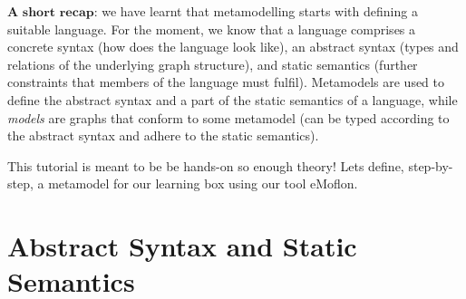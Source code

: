 $\textbf{A short recap:}$  we have learnt that metamodelling starts with defining a suitable language.
For the moment, we know that a language comprises a concrete syntax (how does the language look like),  an abstract syntax (types and relations of the underlying graph structure), and static semantics (further constraints that members of the language must fulfil).
Metamodels are used to define the abstract syntax and a part of the static semantics of a language, while \emph{models} are graphs that conform to some
metamodel (can be typed  according to the abstract syntax and adhere to the static semantics).

This tutorial is meant to be be hands-on so enough theory!
Lets define, step-by-step, a metamodel for our learning box using our tool eMoflon.

\section{Abstract Syntax and Static Semantics}
\label{sec:abstractSyntax}

